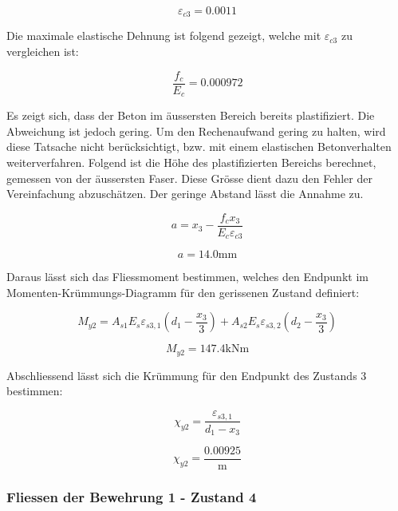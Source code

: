 \documentclass[
  12pt,
  letterpaper,
  egregdoesnotlikesansseriftitles]{scrreprt}
\begin{document}
\begin{equation}\varepsilon_{c3} = 0.0011\end{equation}

Die maximale elastische Dehnung ist folgend gezeigt, welche mit
\(\varepsilon_{c3}\) zu vergleichen ist:

\begin{equation}\frac{f_{c}}{E_{c}} = 0.000972\end{equation}

Es zeigt sich, dass der Beton im äussersten Bereich bereits
plastifiziert. Die Abweichung ist jedoch gering. Um den Rechenaufwand
gering zu halten, wird diese Tatsache nicht berücksichtigt, bzw. mit
einem elastischen Betonverhalten weiterverfahren. Folgend ist die Höhe
des plastifizierten Bereichs berechnet, gemessen von der äussersten
Faser. Diese Grösse dient dazu den Fehler der Vereinfachung
abzuschätzen. Der geringe Abstand lässt die Annahme zu.

\begin{equation}a = x_{3} - \frac{f_{c} x_{3}}{E_{c} \varepsilon_{c3}}\end{equation}

\begin{equation}a = 14.0 \text{mm}\end{equation}

Daraus lässt sich das Fliessmoment bestimmen, welches den Endpunkt im
Momenten-Krümmungs-Diagramm für den gerissenen Zustand definiert:

\begin{equation}M_{y 2} = A_{s 1} E_{s} \varepsilon_{s3,1} \left(d_{1} - \frac{x_{3}}{3}\right) + A_{s 2} E_{s} \varepsilon_{s3,2} \left(d_{2} - \frac{x_{3}}{3}\right)\end{equation}

\begin{equation}M_{y 2} = 147.4 \text{kN} \text{m}\end{equation}

Abschliessend lässt sich die Krümmung für den Endpunkt des Zustands 3
bestimmen:

\begin{equation}\chi_{y2} = \frac{\varepsilon_{s3,1}}{d_{1} - x_{3}}\end{equation}

\begin{equation}\chi_{y2} = \frac{0.00925}{\text{m}}\end{equation}

\hypertarget{fliessen-der-bewehrung-1---zustand-4}{%
\subsubsection{Fliessen der Bewehrung 1 - Zustand
4}\label{fliessen-der-bewehrung-1---zustand-4}}
\end{document}
